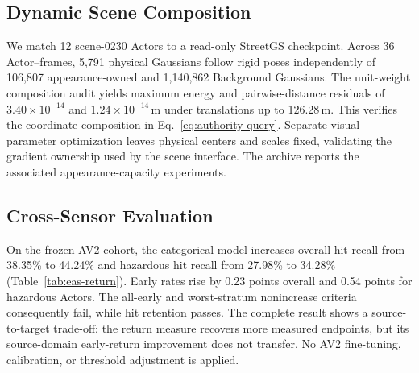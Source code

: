 \subsection{Dynamic Scene Composition}

We match 12 scene-0230 Actors to a read-only StreetGS checkpoint.
Across 36 Actor--frames, 5,791 physical Gaussians follow rigid poses independently of 106,807 appearance-owned
and 1,140,862 Background Gaussians.
The unit-weight composition audit yields maximum energy and pairwise-distance residuals of
$3.40\times10^{-14}$ and $1.24\times10^{-14}$\,m under translations up to 126.28\,m.
This verifies the coordinate composition in Eq.~\ref{eq:authority-query}.
Separate visual-parameter optimization leaves physical centers and scales fixed, validating the gradient ownership
used by the scene interface. The archive reports the associated appearance-capacity experiments.

\subsection{Cross-Sensor Evaluation}

On the frozen AV2 cohort, the categorical model increases overall hit recall from 38.35\% to 44.24\%
and hazardous hit recall from 27.98\% to 34.28\% (Table~\ref{tab:eas-return}).
Early rates rise by 0.23 points overall and 0.54 points for hazardous Actors.
The all-early and worst-stratum nonincrease criteria consequently fail, while hit retention passes.
The complete result shows a source-to-target trade-off: the return measure recovers more measured endpoints,
but its source-domain early-return improvement does not transfer.
No AV2 fine-tuning, calibration, or threshold adjustment is applied.

